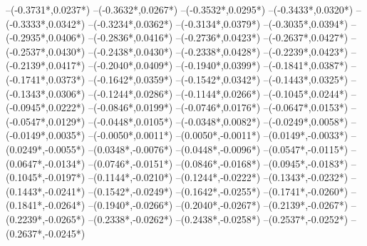 {	--({-0.3731*\xskala},{0.0237*\yskala})
	--({-0.3632*\xskala},{0.0267*\yskala})
	--({-0.3532*\xskala},{0.0295*\yskala})
	--({-0.3433*\xskala},{0.0320*\yskala})
	--({-0.3333*\xskala},{0.0342*\yskala})
	--({-0.3234*\xskala},{0.0362*\yskala})
	--({-0.3134*\xskala},{0.0379*\yskala})
	--({-0.3035*\xskala},{0.0394*\yskala})
	--({-0.2935*\xskala},{0.0406*\yskala})
	--({-0.2836*\xskala},{0.0416*\yskala})
	--({-0.2736*\xskala},{0.0423*\yskala})
	--({-0.2637*\xskala},{0.0427*\yskala})
	--({-0.2537*\xskala},{0.0430*\yskala})
	--({-0.2438*\xskala},{0.0430*\yskala})
	--({-0.2338*\xskala},{0.0428*\yskala})
	--({-0.2239*\xskala},{0.0423*\yskala})
	--({-0.2139*\xskala},{0.0417*\yskala})
	--({-0.2040*\xskala},{0.0409*\yskala})
	--({-0.1940*\xskala},{0.0399*\yskala})
	--({-0.1841*\xskala},{0.0387*\yskala})
	--({-0.1741*\xskala},{0.0373*\yskala})
	--({-0.1642*\xskala},{0.0359*\yskala})
	--({-0.1542*\xskala},{0.0342*\yskala})
	--({-0.1443*\xskala},{0.0325*\yskala})
	--({-0.1343*\xskala},{0.0306*\yskala})
	--({-0.1244*\xskala},{0.0286*\yskala})
	--({-0.1144*\xskala},{0.0266*\yskala})
	--({-0.1045*\xskala},{0.0244*\yskala})
	--({-0.0945*\xskala},{0.0222*\yskala})
	--({-0.0846*\xskala},{0.0199*\yskala})
	--({-0.0746*\xskala},{0.0176*\yskala})
	--({-0.0647*\xskala},{0.0153*\yskala})
	--({-0.0547*\xskala},{0.0129*\yskala})
	--({-0.0448*\xskala},{0.0105*\yskala})
	--({-0.0348*\xskala},{0.0082*\yskala})
	--({-0.0249*\xskala},{0.0058*\yskala})
	--({-0.0149*\xskala},{0.0035*\yskala})
	--({-0.0050*\xskala},{0.0011*\yskala})
	--({0.0050*\xskala},{-0.0011*\yskala})
	--({0.0149*\xskala},{-0.0033*\yskala})
	--({0.0249*\xskala},{-0.0055*\yskala})
	--({0.0348*\xskala},{-0.0076*\yskala})
	--({0.0448*\xskala},{-0.0096*\yskala})
	--({0.0547*\xskala},{-0.0115*\yskala})
	--({0.0647*\xskala},{-0.0134*\yskala})
	--({0.0746*\xskala},{-0.0151*\yskala})
	--({0.0846*\xskala},{-0.0168*\yskala})
	--({0.0945*\xskala},{-0.0183*\yskala})
	--({0.1045*\xskala},{-0.0197*\yskala})
	--({0.1144*\xskala},{-0.0210*\yskala})
	--({0.1244*\xskala},{-0.0222*\yskala})
	--({0.1343*\xskala},{-0.0232*\yskala})
	--({0.1443*\xskala},{-0.0241*\yskala})
	--({0.1542*\xskala},{-0.0249*\yskala})
	--({0.1642*\xskala},{-0.0255*\yskala})
	--({0.1741*\xskala},{-0.0260*\yskala})
	--({0.1841*\xskala},{-0.0264*\yskala})
	--({0.1940*\xskala},{-0.0266*\yskala})
	--({0.2040*\xskala},{-0.0267*\yskala})
	--({0.2139*\xskala},{-0.0267*\yskala})
	--({0.2239*\xskala},{-0.0265*\yskala})
	--({0.2338*\xskala},{-0.0262*\yskala})
	--({0.2438*\xskala},{-0.0258*\yskala})
	--({0.2537*\xskala},{-0.0252*\yskala})
	--({0.2637*\xskala},{-0.0245*\yskala})
}
